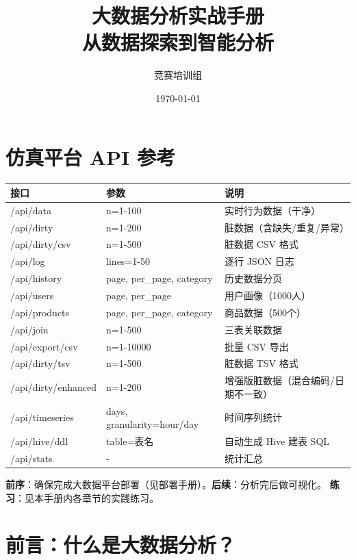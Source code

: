\documentclass[12pt,a4paper]{article}
\title{\textbf{大数据分析实战手册}\\[0.5em]\large 从数据探索到智能分析}
\author{竞赛培训组}
\date{\today}
\begin{document}
\maketitle

\section*{仿真平台 API 参考}

{\footnotesize
\begin{table}[H]
\centering
\begin{tabular}{lll}
\toprule
\textbf{接口} & \textbf{参数} & \textbf{说明} \\
\midrule
/api/data & n=1-100 & 实时行为数据（干净） \\
/api/dirty & n=1-200 & 脏数据（含缺失/重复/异常） \\
/api/dirty/csv & n=1-500 & 脏数据 CSV 格式 \\
/api/log & lines=1-50 & 逐行 JSON 日志 \\
/api/history & page, per\_page, category & 历史数据分页 \\
/api/users & page, per\_page & 用户画像（1000人） \\
/api/products & page, per\_page, category & 商品数据（500个） \\
/api/join & n=1-500 & 三表关联数据 \\
/api/export/csv & n=1-10000 & 批量 CSV 导出 \\
/api/dirty/tsv & n=1-500 & 脏数据 TSV 格式 \\
/api/dirty/enhanced & n=1-200 & 增强版脏数据（混合编码/日期不一致） \\
/api/timeseries & days, granularity=hour/day & 时间序列统计 \\
/api/hive/ddl & table=表名 & 自动生成 Hive 建表 SQL \\
/api/stats & - & 统计汇总 \\
\bottomrule
\end{tabular}
\end{table}
}

\begin{tipbox}[学习指引]
\textbf{前序}：确保完成大数据平台部署（见部署手册）。\textbf{后续}：分析完后做可视化。
\textbf{练习}：见本手册内各章节的实践练习。
\end{tipbox}

\tableofcontents
\newpage

\section{前言：什么是大数据分析？}
\end{document}
